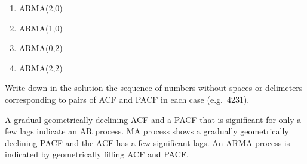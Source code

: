 \begin{question}
\begin{enumerate}
\def\labelenumi{\arabic{enumi}.}
\item
  ARMA(2,0)
\item
  ARMA(1,0)
\item
  ARMA(0,2)
\item
  ARMA(2,2)
\end{enumerate}

Write down in the solution the sequence of numbers without spaces or delimeters corresponding to pairs of ACF and PACF in each case (e.g.~4231).
\end{question}

\begin{solution}
A gradual geometrically declining ACF and a PACF that is significant for only a few lags indicate an AR process. MA process shows a gradually geometrically declining PACF and the ACF has a few significant lags. An ARMA process is indicated by geometrically filling ACF and PACF.
\end{solution}

